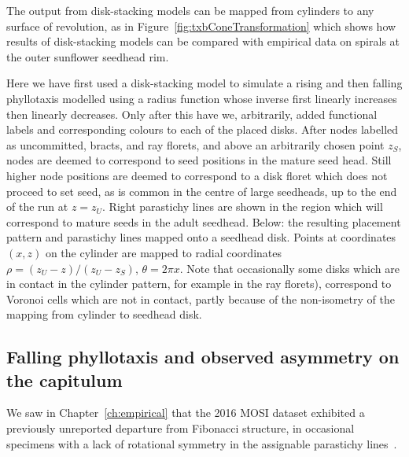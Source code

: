 The output from disk-stacking models can be mapped from cylinders to any surface of revolution, as in Figure~\ref{fig:txbConeTransformation} which shows how  results of disk-stacking models can be compared with empirical data on spirals at the outer sunflower seedhead rim. 

Here we have first used a disk-stacking model to simulate a rising and then falling phyllotaxis modelled using a radius function whose inverse first linearly increases then linearly decreases. Only after this have we, arbitrarily, added  functional labels and corresponding colours to each of the placed disks. After nodes labelled as uncommitted, bracts, and ray florets, and above an arbitrarily chosen point $z_S$, nodes are deemed to correspond to seed positions in the mature seed head.  Still higher node positions are deemed to correspond to a disk floret which does not proceed to set seed, as is common in the centre of large seedheads, up to the end of the run at $z=z_U$.   Right parastichy lines are shown in the region which will correspond to mature seeds in the adult seedhead. Below: the resulting placement pattern and parastichy lines mapped onto a seedhead disk. Points at coordinates $(x,z)$ on the cylinder are mapped to radial coordinates $\rho=(z_U-z)/(z_U-z_S)$, $\theta=2\pi x$. Note that occasionally some disks which are in contact in the cylinder pattern, for example in the ray florets), correspond to Voronoi cells which are not in  contact, partly because of the non-isometry of the mapping from cylinder to seedhead disk.
%

 
\clearpage
\subsection{Falling phyllotaxis and observed asymmetry on the capitulum}
We saw in Chapter~\ref{ch:empirical} that the 2016 MOSI dataset exhibited  a previously unreported departure from Fibonacci structure, in occasional specimens with a lack of rotational symmetry in the assignable parastichy lines~\cite{swintonNovelFibonacciNonFibonacci2016}. 

